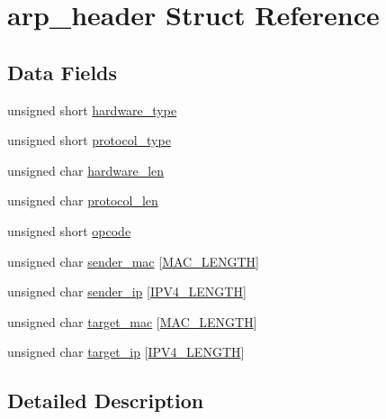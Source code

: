 \hypertarget{structarp__header}{}\section{arp\+\_\+header Struct Reference}
\label{structarp__header}
\subsection*{Data Fields}
\begin{DoxyCompactItemize}
\item 
unsigned short \hyperlink{structarp__header_a26f790af15777120447eddb59c15bc7d}{hardware\+\_\+type}
\item 
unsigned short \hyperlink{structarp__header_a24dd89b1e5b9c31d4c2655df0d838673}{protocol\+\_\+type}
\item 
unsigned char \hyperlink{structarp__header_a63496664c0728baa8b8f213864290325}{hardware\+\_\+len}
\item 
unsigned char \hyperlink{structarp__header_a199abced9d3b3367a4ed4125e63ce9d4}{protocol\+\_\+len}
\item 
unsigned short \hyperlink{structarp__header_a8c0824ace997e9dda49fb5116a02fc65}{opcode}
\item 
unsigned char \hyperlink{structarp__header_abb59a40a80872088400763e1fd6acaf2}{sender\+\_\+mac} \mbox{[}\hyperlink{show__arp_8c_ac941b6796b26d46622ba39ad70667ed3}{M\+A\+C\+\_\+\+L\+E\+N\+G\+TH}\mbox{]}
\item 
unsigned char \hyperlink{structarp__header_acf457b77e1ea289ae333fd2287954758}{sender\+\_\+ip} \mbox{[}\hyperlink{show__arp_8c_a9935c761f5e47454f667f0d5e4208e89}{I\+P\+V4\+\_\+\+L\+E\+N\+G\+TH}\mbox{]}
\item 
unsigned char \hyperlink{structarp__header_a3b66dfb45363fee0dc6e5e1a6d6c5156}{target\+\_\+mac} \mbox{[}\hyperlink{show__arp_8c_ac941b6796b26d46622ba39ad70667ed3}{M\+A\+C\+\_\+\+L\+E\+N\+G\+TH}\mbox{]}
\item 
unsigned char \hyperlink{structarp__header_a7357fb5e2df0b32e297caf95618fcc73}{target\+\_\+ip} \mbox{[}\hyperlink{show__arp_8c_a9935c761f5e47454f667f0d5e4208e89}{I\+P\+V4\+\_\+\+L\+E\+N\+G\+TH}\mbox{]}
\end{DoxyCompactItemize}


\subsection{Detailed Description}


